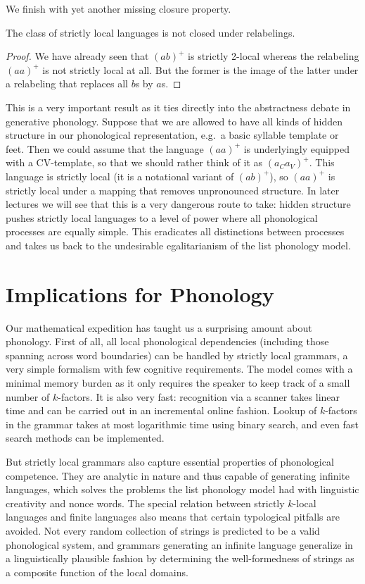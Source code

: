 We finish with yet another missing closure property.
%
\begin{lemma}
    The class of strictly local languages is not closed under relabelings.
\end{lemma}
%
\begin{proof}
    We have already seen that $(ab)^+$ is strictly 2-local whereas the relabeling $(aa)^+$ is not strictly local at all.
    But the former is the image of the latter under a relabeling that replaces all $b$s by $a$s.
\end{proof}
%
This is a very important result as it ties directly into the abstractness debate in generative phonology.
Suppose that we are allowed to have all kinds of hidden structure in our phonological representation, e.g.\ a basic syllable template or feet.
Then we could assume that the language $(aa)^+$ is underlyingly equipped with a CV-template, so that we should rather think of it as $(a_C a_V)^+$.
This language is strictly local (it is a notational variant of $(ab)^+$), so $(aa)^+$ is strictly local under a mapping that removes unpronounced structure.
In later lectures we will see that this is a very dangerous route to take: hidden structure pushes strictly local languages to a level of power where all phonological processes are equally simple.
This eradicates all distinctions between processes and takes us back to the undesirable egalitarianism of the list phonology model.

\section{Implications for Phonology}
Our mathematical expedition has taught us a surprising amount about phonology.
First of all, all local phonological dependencies (including those spanning across word boundaries) can be handled by strictly local grammars, a very simple formalism with few cognitive requirements.
The model comes with a minimal memory burden as it only requires the speaker to keep track of a small number of $k$-factors.
It is also very fast: recognition via a scanner takes linear time and can be carried out in an incremental online fashion.
Lookup of $k$-factors in the grammar takes at most logarithmic time using binary search, and even fast search methods can be implemented.

But strictly local grammars also capture essential properties of phonological competence.
They are analytic in nature and thus capable of generating infinite languages, which solves the problems the list phonology model had with linguistic creativity and nonce words.
The special relation between strictly $k$-local languages and finite languages also means that certain typological pitfalls are avoided.
Not every random collection of strings is predicted to be a valid phonological system, and grammars generating an infinite language generalize in a linguistically plausible fashion by determining the well-formedness of strings as a composite function of the local domains.

